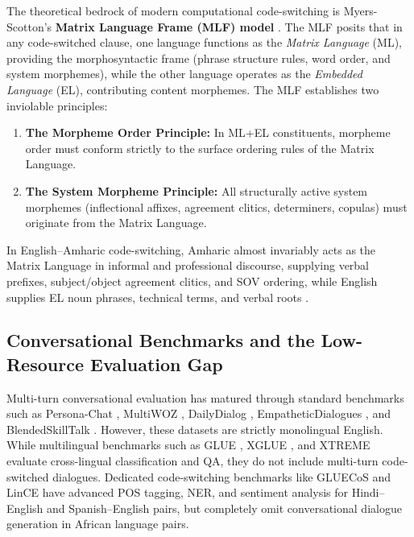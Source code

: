 \documentclass[11pt,a4paper]{article}
\begin{document}
The theoretical bedrock of modern computational code-switching is Myers-Scotton's \textbf{Matrix Language Frame (MLF) model} \cite{myersscotton1993duelling, myersscotton2002contact}. The MLF posits that in any code-switched clause, one language functions as the \textit{Matrix Language} (ML), providing the morphosyntactic frame (phrase structure rules, word order, and system morphemes), while the other language operates as the \textit{Embedded Language} (EL), contributing content morphemes. The MLF establishes two inviolable principles:
\begin{enumerate}
    \item \textbf{The Morpheme Order Principle:} In ML+EL constituents, morpheme order must conform strictly to the surface ordering rules of the Matrix Language.
    \item \textbf{The System Morpheme Principle:} All structurally active system morphemes (inflectional affixes, agreement clitics, determiners, copulas) must originate from the Matrix Language.
\end{enumerate}
In English--Amharic code-switching, Amharic almost invariably acts as the Matrix Language in informal and professional discourse, supplying verbal prefixes, subject/object agreement clitics, and SOV ordering, while English supplies EL noun phrases, technical terms, and verbal roots \cite{leyew1998amharic, alebachew2024african}.

\subsection{Conversational Benchmarks and the Low-Resource Evaluation Gap}
Multi-turn conversational evaluation has matured through standard benchmarks such as Persona-Chat \cite{zhang2018personachat}, MultiWOZ \cite{budzianowski2018multiwoz}, DailyDialog \cite{li2017dailydialog}, EmpatheticDialogues \cite{rashkin2019empathetic}, and BlendedSkillTalk \cite{smith2020blended}. However, these datasets are strictly monolingual English. While multilingual benchmarks such as GLUE \cite{wang2018glue}, XGLUE \cite{liang2020xglue}, and XTREME \cite{hu2020xtreme} evaluate cross-lingual classification and QA, they do not include multi-turn code-switched dialogues. Dedicated code-switching benchmarks like GLUECoS \cite{khanuja2020gluecos} and LinCE \cite{aguilar2020lince} have advanced POS tagging, NER, and sentiment analysis for Hindi--English and Spanish--English pairs, but completely omit conversational dialogue generation in African language pairs.
\end{document}
